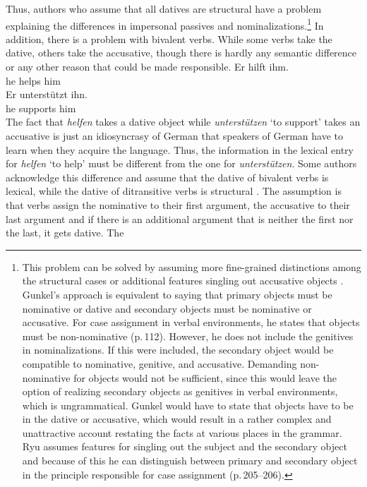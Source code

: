Thus, authors who assume that all datives are structural have a problem explaining the differences in
impersonal passives and nominalizations.\footnote{\label{fn-structural-dative}
  This problem can be solved by assuming more fine-grained distinctions among the structural cases
  \citep[]{Gunkel2003b} or additional features singling out accusative objects
  \citep[]{Ryu97a}. Gunkel's approach is equivalent to saying that primary objects must be nominative
  or dative and secondary objects must be nominative or accusative. For case assignment in verbal
  environments, he states that objects must be non-nominative (p.\,112). However, he does not include the
  genitives in nominalizations. If this were included, the secondary object would be compatible to
  nominative, genitive, and accusative. Demanding non-nominative for objects would not be
  sufficient, since this would leave the option of realizing secondary objects as genitives in
  verbal environments, which is ungrammatical. Gunkel would have to state that objects have to
  be in the dative or accusative, which would result in a rather complex and unattractive
  account restating the facts at various places in the grammar. Ryu assumes features for singling
  out the subject and the secondary object and because of this he can distinguish between primary
  and secondary object in the principle responsible for case assignment (p.\,205--206). 
} In addition, there is a problem with bivalent verbs. While
some verbs take the dative, others take the accusative, though there is hardly any semantic
difference or any other reason that could be made responsible.
\eal
\ex 
\gll Er hilft ihm.\\
     he helps him\\
\ex 
\gll Er unterstützt ihn.\\
     he supports him\\
\zl
The fact that \emph{helfen} takes a dative object while \emph{unterstützen} `to support' takes an accusative is
just an idiosyncrasy of German that speakers of German have to learn when they acquire the
language. Thus, the information in the lexical entry for \emph{helfen} `to help' must be different from the one
for \emph{unterstützen}. Some authors acknowledge this difference and assume that the dative of
bivalent verbs is lexical, while the dative of ditransitive verbs is structural \citep[, 51]{Wunderlich97a}. The assumption is
that verbs assign the nominative to their first argument, the accusative to their last argument and
if there is an additional argument that is neither the first nor the last, it gets dative. The
